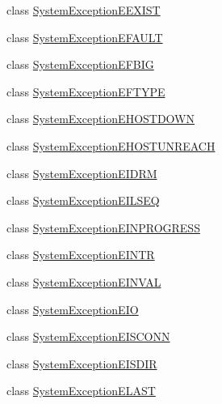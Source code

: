 \begin{DoxyCompactItemize}
\item 
class \hyperlink{class_communication_1_1_exception_1_1_system_exception_e_e_x_i_s_t}{System\+Exception\+E\+E\+X\+I\+S\+T}
\item 
class \hyperlink{class_communication_1_1_exception_1_1_system_exception_e_f_a_u_l_t}{System\+Exception\+E\+F\+A\+U\+L\+T}
\item 
class \hyperlink{class_communication_1_1_exception_1_1_system_exception_e_f_b_i_g}{System\+Exception\+E\+F\+B\+I\+G}
\item 
class \hyperlink{class_communication_1_1_exception_1_1_system_exception_e_f_t_y_p_e}{System\+Exception\+E\+F\+T\+Y\+P\+E}
\item 
class \hyperlink{class_communication_1_1_exception_1_1_system_exception_e_h_o_s_t_d_o_w_n}{System\+Exception\+E\+H\+O\+S\+T\+D\+O\+W\+N}
\item 
class \hyperlink{class_communication_1_1_exception_1_1_system_exception_e_h_o_s_t_u_n_r_e_a_c_h}{System\+Exception\+E\+H\+O\+S\+T\+U\+N\+R\+E\+A\+C\+H}
\item 
class \hyperlink{class_communication_1_1_exception_1_1_system_exception_e_i_d_r_m}{System\+Exception\+E\+I\+D\+R\+M}
\item 
class \hyperlink{class_communication_1_1_exception_1_1_system_exception_e_i_l_s_e_q}{System\+Exception\+E\+I\+L\+S\+E\+Q}
\item 
class \hyperlink{class_communication_1_1_exception_1_1_system_exception_e_i_n_p_r_o_g_r_e_s_s}{System\+Exception\+E\+I\+N\+P\+R\+O\+G\+R\+E\+S\+S}
\item 
class \hyperlink{class_communication_1_1_exception_1_1_system_exception_e_i_n_t_r}{System\+Exception\+E\+I\+N\+T\+R}
\item 
class \hyperlink{class_communication_1_1_exception_1_1_system_exception_e_i_n_v_a_l}{System\+Exception\+E\+I\+N\+V\+A\+L}
\item 
class \hyperlink{class_communication_1_1_exception_1_1_system_exception_e_i_o}{System\+Exception\+E\+I\+O}
\item 
class \hyperlink{class_communication_1_1_exception_1_1_system_exception_e_i_s_c_o_n_n}{System\+Exception\+E\+I\+S\+C\+O\+N\+N}
\item 
class \hyperlink{class_communication_1_1_exception_1_1_system_exception_e_i_s_d_i_r}{System\+Exception\+E\+I\+S\+D\+I\+R}
\item 
class \hyperlink{class_communication_1_1_exception_1_1_system_exception_e_l_a_s_t}{System\+Exception\+E\+L\+A\+S\+T}
\item 

\end{DoxyCompactItemize}

